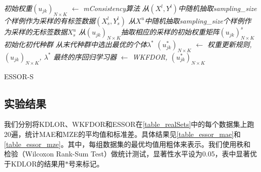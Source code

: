 \IncMargin{1em}
\begin{algorithm}[!h]
\emph{初始权重$(u_{jk})_{N \times K}$ $\leftarrow$ \textit{mConsistency}算法}\;
\emph{从$(X^{l},Y^{l})$中随机抽取sampling\_size个样例作为采样的有标签数据$(X_{s}^{l},Y_{s}^{l})$}\;
\emph{从$X^{u}$中随机抽取sampling\_size个样例作为采样的无标签数据$X_{s}^{u}$}\;
\emph{从$(u_{jk})_{N \times K}$抽取相应的采样的初始权重矩阵$(u_{jk})_{N \times K}^{s}$}\;
\emph{初始化初代种群}\;
\emph{从末代种群中选出最优的个体$\lambda^{*}$}\;
\emph{$(u_{jk}^{*})_{N \times K}$ $\leftarrow$ 权重更新规则, $(u_{jk})_{N \times K}$, $\lambda^{*}$}\;
\emph{最终的序回归学习器 $\leftarrow$ WKFDOR, $(u_{jk}^{*})_{N \times K}$}\;
\caption{ESSOR-S}\label{alg_ESSOR_sampling}
\end{algorithm}\DecMargin{1em}


\subsection{实验结果}

我们分别将KDLOR、WKFDOR和ESSOR在\autoref{table_realSets}中的每个数据集上跑20遍，统计MAE和MZE的平均值和标准差。具体结果见\autoref{table_essor_mae}和\autoref{table_essor_mze}。其中，每组数据集的最优均值用粗体来表示。我们使用秩和检验（Wilcoxon Rank-Sum Test）做统计测试，显著性水平设为0.05，表中显著优于KDLOR的结果用\(*\)号来标记。

